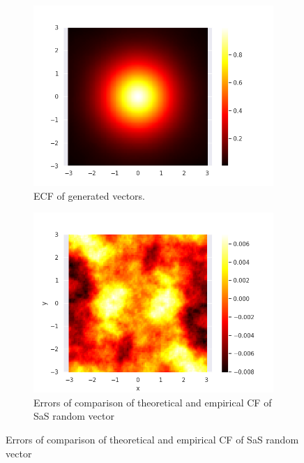 \documentclass{article}
\begin{document}
	\begin{figure}
		\centering
		\begin{subfigure}[H]{0.49\textwidth}
			\centering
			\includegraphics[width=1\linewidth]{images/ex_2_ecf}
			\caption{ECF of generated vectors.}\label{7}
		\end{subfigure}
		\hfill
		\begin{subfigure}[H]{0.49\textwidth}
			\centering
			\includegraphics[width=1\linewidth]{images/ex_2_error_heatmap}
			\caption{Errors of comparison of theoretical and empirical CF of SaS random vector}\label{8}
		\end{subfigure}
	\end{figure}
	
\end{document}
